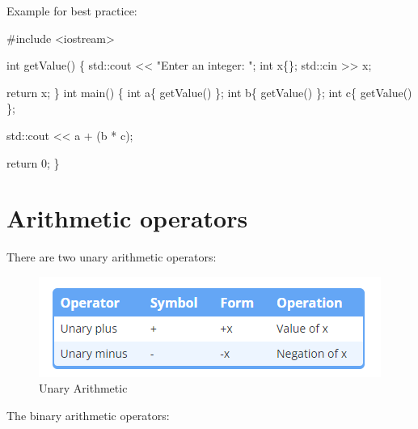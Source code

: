 \documentclass[
  letterpaper,
  DIV=11,
  numbers=noendperiod]{scrreprt}
\newenvironment{Shaded}{\begin{snugshade}}{\end{snugshade}}
\newcommand{\CommentTok}[1]{\textcolor[rgb]{0.37,0.37,0.37}{#1}}
\newcommand{\DecValTok}[1]{\textcolor[rgb]{0.68,0.00,0.00}{#1}}
\newcommand{\ErrorTok}[1]{\textcolor[rgb]{0.68,0.00,0.00}{#1}}
\newcommand{\FunctionTok}[1]{\textcolor[rgb]{0.28,0.35,0.67}{#1}}
\newcommand{\NormalTok}[1]{\textcolor[rgb]{0.00,0.23,0.31}{#1}}
\newcommand{\SpecialCharTok}[1]{\textcolor[rgb]{0.37,0.37,0.37}{#1}}
\newcommand{\StringTok}[1]{\textcolor[rgb]{0.13,0.47,0.30}{#1}}
\begin{document}
Example for best practice:

\begin{Shaded}
\begin{Highlighting}[]
\CommentTok{\#include \textless{}iostream\textgreater{}}

\NormalTok{int }\FunctionTok{getValue}\NormalTok{()}
\NormalTok{\{}
\NormalTok{    std}\SpecialCharTok{::}\NormalTok{cout }\SpecialCharTok{\textless{}}\ErrorTok{\textless{}} \StringTok{"Enter an integer: "}\NormalTok{;}
\NormalTok{    int x\{\};}
\NormalTok{    std}\SpecialCharTok{::}\NormalTok{cin }\SpecialCharTok{\textgreater{}}\ErrorTok{\textgreater{}}\NormalTok{ x;}

\NormalTok{    return x;}
\NormalTok{\}}
\NormalTok{int }\FunctionTok{main}\NormalTok{()}
\NormalTok{\{}
\NormalTok{    int a\{ }\FunctionTok{getValue}\NormalTok{() \};}
\NormalTok{    int b\{ }\FunctionTok{getValue}\NormalTok{() \};}
\NormalTok{    int c\{ }\FunctionTok{getValue}\NormalTok{() \};}

\NormalTok{    std}\SpecialCharTok{::}\NormalTok{cout }\SpecialCharTok{\textless{}}\ErrorTok{\textless{}}\NormalTok{ a }\SpecialCharTok{+}\NormalTok{ (b }\SpecialCharTok{*}\NormalTok{ c);}

\NormalTok{    return }\DecValTok{0}\NormalTok{;}
\NormalTok{\}}
\end{Highlighting}
\end{Shaded}

\hypertarget{arithmetic-operators}{%
\section{Arithmetic operators}\label{arithmetic-operators}}

There are two unary arithmetic operators:

\begin{figure}

\includegraphics{./figure/uniArithmetic.PNG} \hfill{}

\caption{Unary Arithmetic}

\end{figure}

The binary arithmetic operators:
\end{document}
